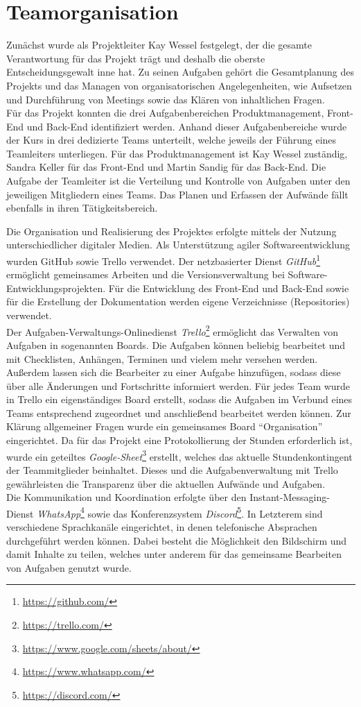\section{Teamorganisation}
Zunächst wurde als Projektleiter Kay Wessel festgelegt, der die gesamte Verantwortung für das Projekt trägt und deshalb die oberste Entscheidungsgewalt inne hat. 
Zu seinen Aufgaben gehört die Gesamtplanung des Projekts und das Managen von organisatorischen Angelegenheiten, wie Aufsetzen und Durchführung von Meetings sowie das Klären von inhaltlichen Fragen.
\\Für das Projekt konnten die drei Aufgabenbereichen Produktmanagement, Front-End und Back-End identifiziert werden.
Anhand dieser Aufgabenbereiche wurde der Kurs in drei dedizierte Teams unterteilt, welche jeweils der Führung eines Teamleiters unterliegen.
Für das Produktmanagement ist Kay Wessel zuständig, Sandra Keller für das Front-End und Martin Sandig für das Back-End.
Die Aufgabe der Teamleiter ist die Verteilung und Kontrolle von Aufgaben unter den jeweiligen Mitgliedern eines Teams.
Das Planen und Erfassen der Aufwände fällt ebenfalls in ihren Tätigkeitsbereich.

Die Organisation und Realisierung des Projektes erfolgte mittels der Nutzung unterschiedlicher digitaler Medien.
Als Unterstützung agiler Softwareentwicklung wurden GitHub sowie Trello verwendet. 
Der netzbasierter Dienst \textit{GitHub}\footnote{\url{https://github.com/}} ermöglicht gemeinsames Arbeiten und die Versionsverwaltung bei Software-Entwicklungsprojekten. 
Für die Entwicklung des Front-End und Back-End sowie für die Erstellung der Dokumentation werden eigene Verzeichnisse (Repositories) verwendet. 
\\Der Aufgaben-Verwaltungs-Onlinedienst \textit{Trello}\footnote{\url{https://trello.com/}} ermöglicht das Verwalten von Aufgaben in sogenannten Boards. 
Die Aufgaben können beliebig bearbeitet und mit Checklisten, Anhängen, Terminen und vielem mehr versehen werden.
Außerdem lassen sich die Bearbeiter zu einer Aufgabe hinzufügen, sodass diese über alle Änderungen und Fortschritte informiert werden.
Für jedes Team wurde in Trello ein eigenständiges Board erstellt, sodass die Aufgaben im Verbund eines Teams entsprechend zugeordnet und anschließend bearbeitet werden können. 
Zur Klärung allgemeiner Fragen wurde ein gemeinsames Board \enquote{Organisation} eingerichtet.
Da für das Projekt eine Protokollierung der Stunden erforderlich ist, wurde ein geteiltes \textit{Google-Sheet}\footnote{\url{https://www.google.com/sheets/about/}} erstellt, welches das aktuelle Stundenkontingent der Teammitglieder beinhaltet. 
Dieses und die Aufgabenverwaltung mit Trello gewährleisten die Transparenz über die aktuellen Aufwände und Aufgaben. 
\\Die Kommunikation und Koordination erfolgte über den Instant-Messaging-Dienst \textit{WhatsApp}\footnote{\url{https://www.whatsapp.com/}} sowie das Konferenzsystem \textit{Discord}\footnote{\url{https://discord.com/}}.
In Letzterem sind verschiedene Sprachkanäle eingerichtet, in denen telefonische Absprachen durchgeführt werden können.
Dabei besteht die Möglichkeit den Bildschirm und damit Inhalte zu teilen, welches unter anderem für das gemeinsame Bearbeiten von Aufgaben genutzt wurde. 
